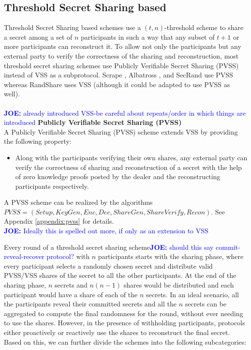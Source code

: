 \documentclass[letterpaper,twocolumn,10pt]{article}
\theoremstyle{definition}
\theoremstyle{remark}
\newcommand{\joenote}[1]{\textcolor{blue}{\textbf{JOE:} #1}}
\begin{document}
\subsection{Threshold Secret Sharing based}
Threshold Secret Sharing based schemes use a $(t,n)$-threshold scheme to share a secret among a set of $n$ participants in such a way that any subset of $t+1$ or more participants can reconstruct it. To allow not only the participants but any external party to verify the correctness of the sharing and reconstruction, most threshold secret sharing schemes use Publicly Verifiable Secret Sharing (PVSS)  \cite{schoenmakers1999simple, cascudo2017scrape} instead of VSS as a subprotocol. Scrape \cite{cascudo2017scrape}, Albatross \cite{cascudo2020albatross}, and SecRand \cite{guo2020secRand} use PVSS whereas RandShare \cite{syta2017scalable} uses VSS (although it could be adapted to use PVSS as well).\\\\
\joenote{already introduced VSS-be careful about repeats/order in which things are introduced}
\textbf{Publicly Verifiable Secret Sharing (PVSS)}\\
A Publicly Verifiable Secret Sharing (PVSS) scheme extends VSS by providing the following property:
\begin{itemize}
    \item Along with the participants verifying their own shares, any external party can verify the correctness of sharing and reconstruction of a secret with the help of zero knowledge proofs posted by the dealer and the reconstructing participants respectively.
\end{itemize}
A PVSS scheme can be realized by the algorithms $PVSS = (Setup, KeyGen, Enc, Dec, ShareGen, ShareVerify, Recon)$. See Appendix \ref{appendix:pvss} for details.\\
\joenote{Ideally this is spelled out more, if only as an extension to VSS}

Every round of a threshold secret sharing scheme\joenote{should this say commit-reveal-recover protocol?} with $n$ participants starts with the sharing phase, where every participant selects a randomly chosen secret and distribute valid PVSS/VSS shares of the secret to all the other participants. At the end of the sharing phase, $n$ secrets and $n(n-1)$ shares would be distributed and each participant would have a share of each of the $n$ secrets. In an ideal scenario, all the participants reveal their committed secrets and all the $n$ secrets can be aggregated to compute the final randomness for the round, without ever needing to use the shares. However, in the presence of withholding participants, protocols either proactively or reactively use the shares to reconstruct the final secret. Based on this, we can further divide the schemes into the following subcategories:
\end{document}
